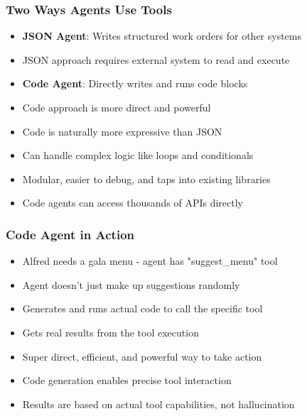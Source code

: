 \begin{frame}[fragile]\frametitle{Two Ways Agents Use Tools}
      \begin{itemize}
        \item \textbf{JSON Agent}: Writes structured work orders for other systems
        \item JSON approach requires external system to read and execute
        \item \textbf{Code Agent}: Directly writes and runs code blocks
        \item Code approach is more direct and powerful
        \item Code is naturally more expressive than JSON
        \item Can handle complex logic like loops and conditionals
        \item Modular, easier to debug, and taps into existing libraries
        \item Code agents can access thousands of APIs directly
      \end{itemize}
\end{frame}

\begin{frame}[fragile]\frametitle{Code Agent in Action}
      \begin{itemize}
        \item Alfred needs a gala menu - agent has "suggest\_menu" tool
        \item Agent doesn't just make up suggestions randomly
        \item Generates and runs actual code to call the specific tool
        \item Gets real results from the tool execution
        \item Super direct, efficient, and powerful way to take action
        \item Code generation enables precise tool interaction
        \item Results are based on actual tool capabilities, not hallucination
      \end{itemize}
\end{frame}

